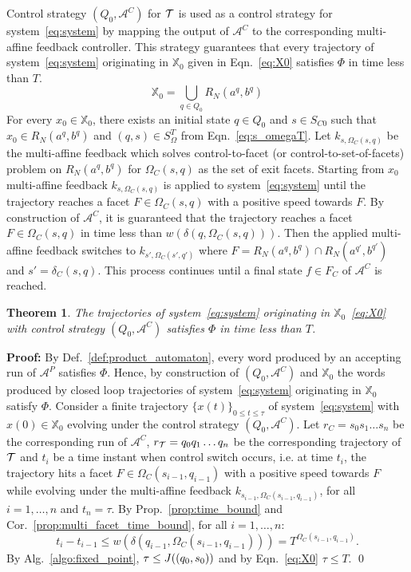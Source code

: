 \documentclass{ifacconf}
\newtheorem{theorem}{Theorem}
\newcommand{\TS}{{\cal T}}
\newcommand{\XO}{\ensuremath{\mathbb{X}_0}}
\newcommand{\AUTOMATON}{\ensuremath{\mathcal{A}}}
\newcommand{\TIMEBOUND}{\ensuremath{T}}
\begin{document}
Control strategy $(Q_0,\AUTOMATON^C)$ for $\TS$ is used as a control strategy for system~\eqref{eq:system} by mapping the output of $\AUTOMATON^C$ to the corresponding multi-affine feedback controller. 
This strategy guarantees that every trajectory of system~\eqref{eq:system} originating in $\XO$ given in Eqn.~\eqref{eq:X0} satisfies $\Phi$ in time less than \TIMEBOUND.
\begin{equation}\label{eq:X0}
	\XO = \bigcup_{q \in Q_0} R_N(a^q, b^q)
\end{equation} 
For every $x_0 \in \XO$, there exists an initial state $q \in Q_0$ and $s \in S_{C0}$ such that $x_0 \in R_N(a^q, b^q)$ and $(q,s) \in S_\Omega^T$ from Eqn.~\eqref{eq:s_omegaT}.
Let $k_{s,\Omega_C(s,q)}$ be the multi-affine feedback which solves control-to-facet (or control-to-set-of-facets) problem on $R_N(a^q, b^q)$ for $\Omega_C(s,q)$ as the set of exit facets. Starting from $x_0$ multi-affine feedback $k_{s,\Omega_C(s,q)}$ is applied to system~\eqref{eq:system} until the trajectory reaches a facet $F \in \Omega_C(s,q)$ with a positive speed towards $F$. By construction of $\AUTOMATON^C$, it is guaranteed that the trajectory reaches a facet $F \in \Omega_C(s,q)$ in time less than $w(\delta(q, \Omega_C(s,q)))$.
Then the applied multi-affine feedback switches to $k_{s',\Omega_C(s',q')}$ where $F = R_N(a^q, b^q) \cap R_N(a^{q'}, b^{q'})$ and $s' = \delta_C(s,q)$. This process continues until a final state $f \in F_C$ of $\AUTOMATON^C$ is reached.



\begin{theorem}\label{thm:main}
The trajectories of system~\eqref{eq:system} originating in $\XO$~\eqref{eq:X0} with control strategy $(Q_0,\AUTOMATON^C)$ satisfies $\Phi$ in time less than \TIMEBOUND.  
\end{theorem}	
{\bf Proof:}
By Def.~\ref{def:product_automaton}, every word produced by an accepting run of $\AUTOMATON^P$ satisfies $\Phi$. Hence, by construction of $(Q_0, \AUTOMATON^{C})$ and $\XO$ the words produced by closed loop trajectories of system~\eqref{eq:system} originating in $\XO$ satisfy $\Phi$.
Consider a finite trajectory $\{x(t)\}_{0 \leq t \leq \tau}$ of system~\eqref{eq:system} with $x(0) \in \XO$ evolving under the control strategy  $(Q_0,\AUTOMATON^C)$.
Let  $r_C = s_0s_1\ldots s_n$ be the corresponding run of $\AUTOMATON^C$,  $r_{\TS} = q_0q_1\ldots q_n$ be the corresponding trajectory of $\TS$ and $t_i$ be a time instant when control switch occurs, i.e. at time $t_i$, the trajectory hits a facet $F \in \Omega_C(s_{i-1},q_{i-1})$ with a positive speed towards $F$ while evolving under the multi-affine feedback $k_{s_{i-1}, \Omega_C(s_{i-1},q_{i-1})}$, for all $i=1,\ldots,n$ and $t_{n}=\tau$.
By Prop.~\ref{prop:time_bound} and Cor.~\ref{prop:multi_facet_time_bound}, for all $i=1,\ldots,n$:
\begin{equation}
t_i - t_{i-1} \leq w(\delta(q_{i-1}, \Omega_C(s_{i-1}, q_{i-1}))) = T^{\Omega_C(s_{i-1}, q_{i-1})}.
\end{equation}
By Alg.~\ref{algo:fixed_point}, $\tau \leq J((q_0,s_0))$ and by Eqn.~\eqref{eq:X0} $\tau \leq \TIMEBOUND$.
\qed
\end{document}

